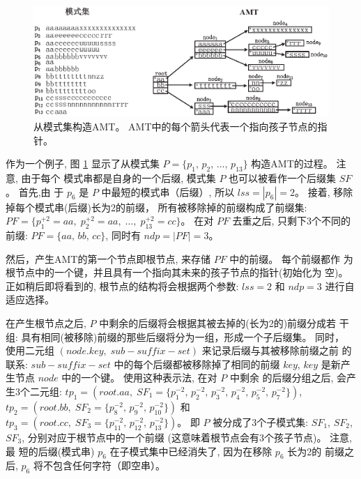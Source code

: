 \begin{figure}[H]
  \centering
  \includegraphics[width=\textwidth]{figures/2_MPM/AMT}
  \caption{从模式集构造AMT。 AMT中的每个箭头代表一个指向孩子节点的指针。}
  \label{fig:AMT}
\end{figure}

作为一个例子, 图 \ref{fig:AMT} 显示了从模式集
$P = \{p_1,\, p_2,\, \dots,\, p_{13}\}$ 构造AMT的过程。 注意, 由于每个
模式串都是自身的一个后缀, 模式集 $P$ 也可以被看作一个后缀集 $SF$。 首先,由
于 $p_6$ 是 $P$ 中最短的模式串（后缀）, 所以 $lss = |p_6| = 2$。 接着,
移除掉每个模式串(后缀)长为2的前缀， 所有被移除掉的前缀构成了前缀集:
$PF = \{p_1^{+2} = aa,\; p_2^{+2} = aa,\; \dots,\; p_{13}^{+2} =
cc\}$。  在对 $PF$ 去重之后, 只剩下3个不同的前缀: $PF = \{aa,\, bb,\,
cc\}$, 同时有 $ndp = |PF| = 3$。

然后，产生AMT的第一个节点即根节点, 来存储 $PF$ 中的前缀。 每个前缀都作
为根节点中的一个键，并且具有一个指向其未来的孩子节点的指针(初始化为
空)。 正如稍后即将看到的, 根节点的结构将会根据两个参数:
$lss=2$ 和 $ndp=3$ 进行自适应选择。

在产生根节点之后, $P$ 中剩余的后缀将会根据其被去掉的(长为2的)前缀分成若
干组: 具有相同(被移除)前缀的那些后缀将分为一组，形成一个子后缀集。 同时，
使用二元组 $(node.key,\; sub-suffix-set)$ 来记录后缀与其被移除前缀之前
的联系: $sub-suffix-set$ 中的每个后缀都被移除掉了相同的前缀 $key$,
$key$ 是新产生节点 $node$ 中的一个键。 使用这种表示法, 在对 $P$ 中剩余
的后缀分组之后, 会产生3个二元组:
$tp_1 = (root.aa,\; SF_1=\{p_1^{-2},\, p_2^{-2},\, p_3^{-2},\,
p_4^{-2},\, p_5^{-2},\, p_7^{-2}\})$,\,
$tp_2 = (root.bb,\; SF_2=\{p_8^{-2},\, p_9^{-2},\,
p_{10}^{-2}\})$
和$tp_3 = (root.cc,\; SF_3=\{p_{11}^{-2},\, p_{12}^{-2},\,
p_{13}^{-2}\})$。 即 $P$ 被分成了3个子模式集: $SF_1$, $SF_2$, $SF_3$,
分别对应于根节点中的一个前缀 (这意味着根节点会有3个孩子节点)。 注意, 最
短的后缀(模式串) $p_6$ 在子模式集中已经消失了, 因为在移除 $p_6$ 长为2的
前缀之后, $p_6$ 将不包含任何字符（即空串）。


